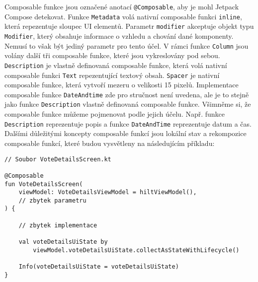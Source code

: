\noindent Composable funkce jsou označené anotací \lstinline|@Composable|, aby je mohl Jetpack Compose detekovat. Funkce \lstinline|Metadata| volá nativní composable funkci \lstinline|inline|, která repezentuje sloupec UI elementů. Parametr \lstinline|modifier| akceptuje objekt typu \lstinline|Modifier|, který obsahuje informace o vzhledu a chování dané komponenty. Nemusí to však být jediný parametr pro tento účel. V rámci funkce \lstinline|Column| jsou volány další tři composable funkce, které jsou vykreslovány pod sebou. \lstinline|Description| je vlastně definovaná composable funkce, která volá nativní composable funkci \lstinline|Text| repezentující textový obsah. \lstinline|Spacer| je nativní composable funkce, která vytvoří mezeru o velikosti 15 pixelů. Implementace composable funkce \lstinline|DateAndtime| zde pro stručnost není uvedena, ale je to stejně jako funkce \lstinline|Description| vlastně definovaná composable funkce. Všimněme si, že composable funkce můžeme pojmenovat podle jejich účelu. Např. funkce \lstinline|Description| reprezentuje popis a funkce \lstinline|DateAndTime| reprezentuje datum a čas. Dalšími důležitými koncepty composable funkcí jsou lokální stav a rekompozice composable funkcí, které budou vysvětleny na následujícím příkladu:

\begin{lstlisting}[caption={Ukázka composable funkce}, label={lst:composable-example}, tabsize=2]
// Soubor VoteDetailsScreen.kt

@Composable
fun VoteDetailsScreen(
	viewModel: VoteDetailsViewModel = hiltViewModel(),
	// zbytek parametru
) {
	
	// zbytek implementace
	
	val voteDetailsUiState by 
		viewModel.voteDetailsUiState.collectAsStateWithLifecycle()
	
	Info(voteDetailsUiState = voteDetailsUiState)
}
\end{lstlisting}


